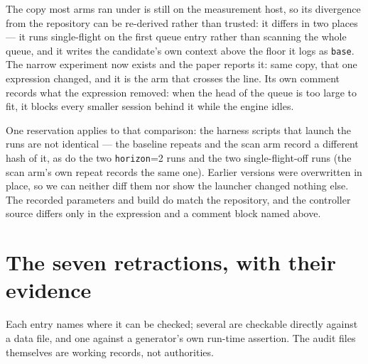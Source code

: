 \documentclass[10pt]{article}
\begin{document}
The copy most arms ran under is still on the measurement host, so its divergence
from the repository can be re-derived rather than trusted: it differs in two
places --- it runs single-flight on the first queue entry rather than scanning
the whole queue, and it writes the candidate's own context above the floor it
logs as \texttt{base}. The narrow experiment now exists and the paper reports it:
same copy, that one expression changed, and it is the arm that crosses the line.
Its own comment records what the expression removed: when the head of the queue
is too large to fit, it blocks every smaller session behind it while the engine
idles.

One reservation applies to that comparison: the harness scripts that launch the
runs are not identical --- the baseline repeats and the scan arm record a
different hash of it, as do the two \texttt{horizon}=2 runs and the two
single-flight-off runs (the scan arm's own repeat records the same one). Earlier
versions were overwritten in place, so we can neither diff them nor show the
launcher changed nothing else. The recorded parameters and build do match the
repository, and the controller source differs only in the expression and a
comment block named above.


\section{The seven retractions, with their evidence}

Each entry names where it can be checked; several are checkable directly against
a data file, and one against a generator's own run-time assertion. The audit
files themselves are working records, not authorities.
\end{document}
